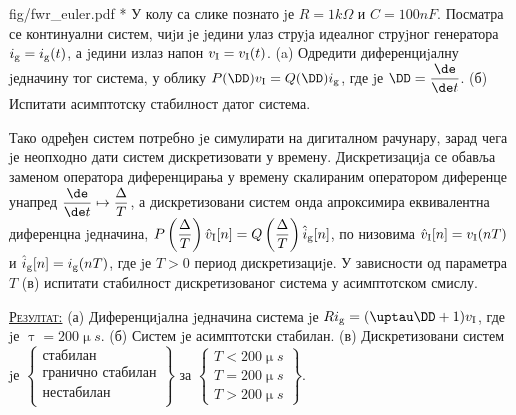 \begin{slikaDesno}{fig/fwr_euler.pdf}    
    {\color{red}*}\PID 
    У колу са слике познато jе $R = 1\unit{k\Omega}$ и 
    $C = 100\unit{nF}$. Посматра се континуални систем, чиjи jе jедини улаз струjа идеалног струjног генератора
    $i_{\rm g} = i_{\rm g}(t)$, а jедини излаз напон $v_{\rm I} = v_{\rm I} (t)$.
    (a) Одредити диференциjалну jедначину тог система, у облику 
    $P(\DD) v_{\rm I} = Q(\DD) i_{\rm g}$, где jе $\DD = \dfrac{\de}{\de t}$.
    (б) Испитати асимптотску стабилност датог система. 
\end{slikaDesno}
Тако одређен систем потребно jе симулирати на дигиталном рачунару,
зарад чега jе неопходно дати систем дискретизовати у времену. Дискретизациjа
се обавља заменом оператора диференцирања у времену скалираним оператором
диференце унапред 
$\dfrac{\de}{\de  t} \mapsto \dfrac{\Delta}{T}$, 
а дискретизовани систем онда апроксимира еквивалентна диференцна jедначина, 
$P\left( 
    \dfrac{\Delta}{T}
\right) \hat v_{\rm I}[n] 
=
Q\left( 
    \dfrac{\Delta}{T}
\right) \hat i_{\rm g}[n]$, 
по низовима $\hat v_{\rm I}[n] = v_{\rm I}(nT)$ и $\hat i_{\rm g}[n] = i_{\rm g}(nT)$, где jе $T > 0$ 
период дискретизациjе. У зависности од параметра $T$ (в)
испитати стабилност дискретизованог система у асимптотском смислу. 
\vspace*{2mm}

\textsc{\underline{Резултат:}}
(а) Диференциjална jедначина система jе $R i_{\rm g} = (\uptau \DD + 1) v_{\rm I}$, где jе 
$\uptau = 200\unit{\upmu s}$.
(б) Систем jе асимптотски стабилан.
(в) 
Дискретизовани систем jе
$
\left\{
\begin{matrix}
    \text{стабилан} \\
    \text{гранично стабилан} \\
    \text{нестабилан} \\
\end{matrix}
\right\}
$ 
за
$
\left\{
\begin{matrix}
    T < 200\unit{\upmu s} \\
    T = 200\unit{\upmu s} \\
    T > 200\unit{\upmu s}
\end{matrix}
\right\}
$.

